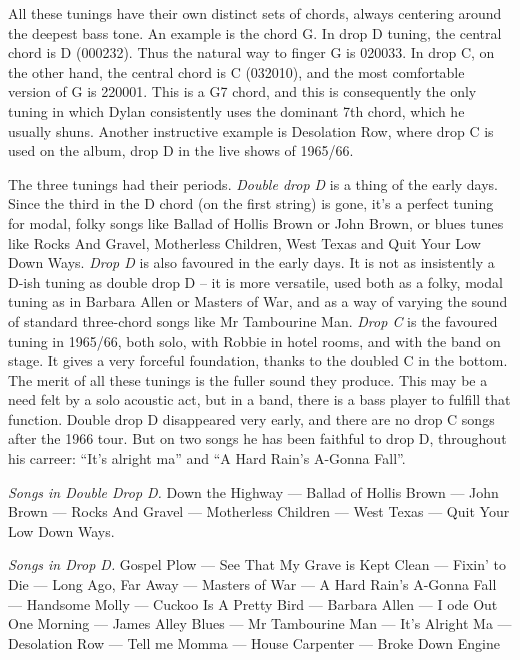 \begin{articlelayout}
All these tunings have their own distinct sets of chords, always
centering around the deepest bass tone. An example is the chord G. In
drop D tuning, the central chord is D (000232). Thus the natural way
to finger G is 020033. In drop C, on the other hand, the central chord
is C (032010), and the most comfortable version of G is 220001. This
is a G7 chord, and this is consequently the only tuning in which Dylan
consistently uses the dominant 7th chord, which he usually
shuns. Another instructive example is Desolation Row, where drop C is
used on the album, drop D in the live shows of 1965/66.

The three tunings had their periods. \emph{Double drop D} is a thing
of the early days. Since the third in the D chord (on the first
string) is gone, it's a perfect tuning for modal, folky songs like
Ballad of Hollis Brown or John Brown, or blues tunes like Rocks And
Gravel, Motherless Children, West Texas and Quit Your Low Down
Ways. \emph{Drop D} is also favoured in the early days. It is not as
insistently a D-ish tuning as double drop D -- it is more versatile,
used both as a folky, modal tuning as in Barbara Allen or Masters of
War, and as a way of varying the sound of standard three-chord songs
like Mr Tambourine Man. \emph{Drop C} is the favoured tuning in
1965/66, both solo, with Robbie in hotel rooms, and with the band on
stage. It gives a very forceful foundation, thanks to the doubled C in
the bottom. \\ The merit of all these tunings is the fuller sound they
produce. This may be a need felt by a solo acoustic act, but in a
band, there is a bass player to fulfill that function. Double drop D
disappeared very early, and there are no drop C songs after the 1966
tour. But on two songs he has been faithful to drop D, throughout his
carreer: ``It's alright ma'' and ``A Hard Rain's A-Gonna
Fall''.

\emph{Songs in Double Drop D.} Down the Highway --- Ballad of Hollis
Brown --- John Brown --- Rocks And Gravel --- Motherless Children ---
West Texas --- Quit Your Low Down Ways.

\emph{Songs in Drop D.} Gospel Plow --- See That My Grave is Kept
Clean --- Fixin' to Die --- Long Ago, Far Away --- Masters of War ---
A Hard Rain's A-Gonna Fall --- Handsome Molly --- Cuckoo Is A Pretty
Bird --- Barbara Allen --- I ode Out One Morning --- James Alley Blues
--- Mr Tambourine Man --- It's Alright Ma --- Desolation Row --- Tell
me Momma --- House Carpenter --- Broke Down Engine


\end{articlelayout}
